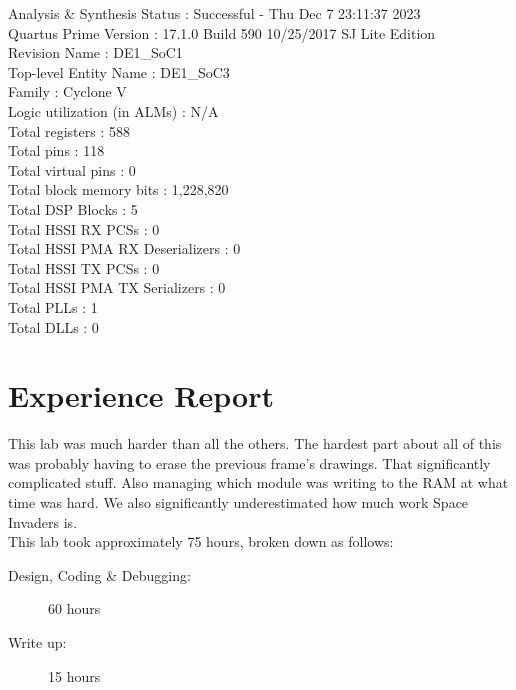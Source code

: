 \documentclass[11pt, titlepage]{article}
\begin{document}
            Analysis \& Synthesis Status : Successful - Thu Dec  7 23:11:37 2023 \\
            Quartus Prime Version : 17.1.0 Build 590 10/25/2017 SJ Lite Edition \\
            Revision Name : DE1\_SoC1 \\
            Top-level Entity Name : DE1\_SoC3 \\
            Family : Cyclone V \\
            Logic utilization (in ALMs) : N/A \\
            Total registers : 588 \\
            Total pins : 118 \\
            Total virtual pins : 0 \\
            Total block memory bits : 1,228,820 \\
            Total DSP Blocks : 5 \\
            Total HSSI RX PCSs : 0 \\
            Total HSSI PMA RX Deserializers : 0 \\
            Total HSSI TX PCSs : 0 \\
            Total HSSI PMA TX Serializers : 0 \\
            Total PLLs : 1 \\
            Total DLLs : 0 \\
            
    \newpage
    \section{Experience Report}
        This lab was much harder than all the others. The hardest part about all of this was probably having to erase the previous frame's drawings. That significantly complicated stuff. Also managing which module was writing to the RAM at what time was hard. We also significantly underestimated how much work Space Invaders is. \\

        This lab took approximately 75 hours, broken down as follows:
        \begin{description}
            \item[Design, Coding \& Debugging:] 60 hours
            \item[Write up:] 15 hours
        \end{description}   
        
\end{document}
